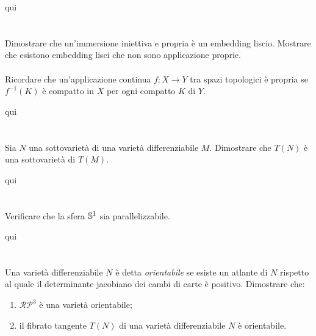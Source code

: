 qui

\tocless\section{}\label{es2-24}

\begin{tcolorbox}
	Dimostrare che un'immersione iniettiva e propria è un embedding liscio. Mostrare che esistono embedding lisci che non sono applicazione proprie.\\\\
	Ricordare che un'applicazione continua $ f : X \to Y $ tra spazi topologici è propria se $ f^{-1}(K) $ è compatto in $ X $ per ogni compatto $ K $ di $ Y $.
\end{tcolorbox}

qui




\tocless\section{}\label{es2-25}

\begin{tcolorbox}
	Sia $ N $ una sottovarietà di una varietà differenziabile $ M $. Dimostrare che $ T(N) $ è una sottovarietà di $ T(M) $.
\end{tcolorbox}

qui

\tocless\section{}\label{BONUS2-4}

\begin{tcolorbox}
	Verificare che la sfera $ \S^{1} $ sia parallelizzabile.
\end{tcolorbox}

qui

\tocless\section{}\label{es2-26}

\begin{tcolorbox}
	Una varietà differenziabile $ N $ è detta \textit{orientabile} se esiste un atlante di $ N $ rispetto al quale il determinante jacobiano dei cambi di carte è positivo. Dimostrare che:
	
	\begin{enumerate}
		\item $ \mathcal{RP}^{3} $ è una varietà orientabile;
		\item il fibrato tangente $ T(N) $ di una varietà differenziabile $ N $ è orientabile.
	\end{enumerate}
\end{tcolorbox}

